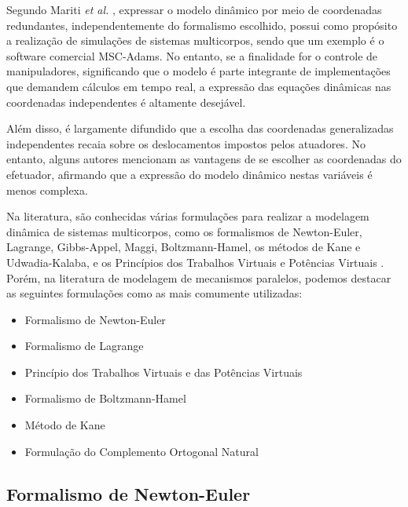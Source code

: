 \documentclass[]{politex}
\begin{document}

Segundo Mariti \emph{et al.} \cite{Mariti}, expressar o modelo dinâmico por meio de coordenadas redundantes, independentemente do formalismo escolhido, possui como propósito a realização de simulações de sistemas multicorpos, sendo que um exemplo é o software comercial MSC-Adams. No entanto, se a finalidade for o controle de manipuladores, significando que o modelo é parte integrante de implementações que demandem  cálculos em tempo real, a expressão das equações dinâmicas nas coordenadas independentes é altamente desejável.

Além disso, é largamente difundido que a escolha das coordenadas generalizadas independentes recaia sobre os deslocamentos impostos pelos atuadores. No entanto, alguns autores \cite{Li, Khalil2} mencionam as vantagens de se escolher as coordenadas do efetuador, afirmando que a expressão do modelo dinâmico nestas variáveis é menos complexa.

Na literatura, são conhecidas várias formulações para realizar a modelagem dinâmica de sistemas multicorpos, como os formalismos de Newton-Euler, Lagrange, Gibbs-Appel, Maggi, Boltzmann-Hamel, os métodos de Kane e Udwadia-Kalaba, e os Princípios dos Trabalhos Virtuais e Potências Virtuais \cite{23orsino}. Porém, na literatura de modelagem de mecanismos paralelos, podemos destacar as seguintes formulações como as mais comumente utilizadas:

\begin{itemize}
\item Formalismo de Newton-Euler
\item Formalismo de Lagrange
\item Princípio dos Trabalhos Virtuais e das Potências Virtuais
\item Formalismo de Boltzmann-Hamel
\item Método de Kane
\item Formulação do Complemento Ortogonal Natural
\end{itemize}

\subsection{Formalismo de Newton-Euler}
\end{document}
